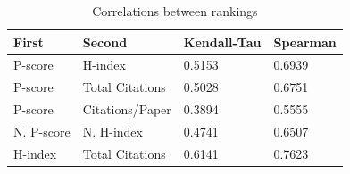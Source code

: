 \documentclass[notitlepage]{svjour3}
\begin{document}
\begin{table}[h!]
  \small
  \centering
  \begin{tabular}{llll} 
  \toprule
  First & Second & Kendall-Tau & Spearman \\ 
  \midrule
  P-score     & H-index           & 0.5153 & 0.6939 \\
  P-score     & Total Citations   & 0.5028 & 0.6751 \\
  P-score     & Citations/Paper   & 0.3894 & 0.5555 \\
  N. P-score  & N. H-index        & 0.4741 & 0.6507 \\
  H-index     & Total Citations   & 0.6141 & 0.7623 \\
  \bottomrule
  \end{tabular}
  \caption{Correlations between rankings}
  \label{tab:conferences}
\end{table}



\end{document}
